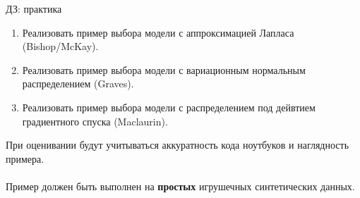 \documentclass[usenames,dvipsnames,10pt,pdf,utf8,russian,aspectratio=43]{beamer}
\begin{document}
\begin{frame}
{ДЗ: практика}
\begin{enumerate}
\item Реализовать пример выбора модели с аппроксимацией Лапласа (Bishop/McKay).

\item Реализовать пример выбора модели с вариационным нормальным распределением (Graves).

\item Реализовать пример выбора модели с распределением под дейвтием градиентного спуска (Maclaurin).
\end{enumerate}

При оценивании будут учитываться аккуратность кода ноутбуков и наглядность примера.\\~\\
Пример должен быть выполнен на  \textbf{простых} игрушечных синтетических данных.
\end{frame}
\end{document}
